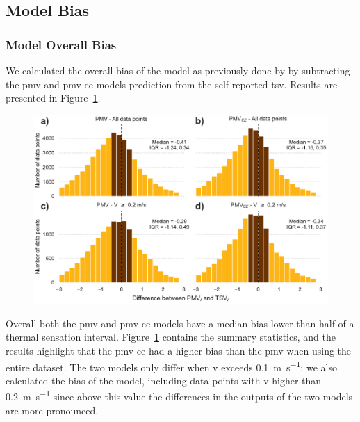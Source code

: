 \subsection{Model Bias}\label{sec:model-bias}
\subsubsection{Model Overall Bias}\label{subsec:model-overall-bias}
We calculated the overall bias of the model as previously done by  by subtracting the \ac{pmv} and  \ac{pmv-ce} models prediction from the self-reported \ac{tsv}.
Results are presented in Figure~\ref{fig:hist_discrepancies}.
\begin{figure}[htb!]
    \centering
    \includegraphics[width=\textwidth]{figures/hist_discrepancies}
    \caption{}
    \label{fig:hist_discrepancies}
\end{figure} 
Overall both the \ac{pmv} and \ac{pmv-ce} models have a median bias lower than half of a thermal sensation interval.
Figure~\ref{fig:hist_discrepancies} contains the summary statistics, and the results highlight that the \ac{pmv-ce} had a higher bias than the \ac{pmv} when using the entire dataset.
The two models only differ when \ac{v} exceeds \qty{0.1}{\m\per\s}; we also calculated the bias of the model, including data points with \ac{v} higher than \qty{0.2}{\m\per\s} since above this value the differences in the outputs of the two models are more pronounced.
